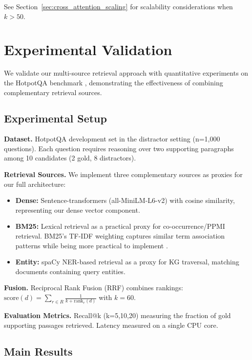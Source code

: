 \documentclass[11pt,a4paper]{article}
\begin{document}
See Section~\ref{sec:cross_attention_scaling} for scalability considerations when $k > 50$.

\section{Experimental Validation}
\label{sec:experiments}

We validate our multi-source retrieval approach with quantitative experiments on the HotpotQA benchmark \citep{yang2018hotpotqa}, demonstrating the effectiveness of combining complementary retrieval sources.

\subsection{Experimental Setup}

\textbf{Dataset.} HotpotQA development set in the distractor setting (n=1,000 questions). Each question requires reasoning over two supporting paragraphs among 10 candidates (2 gold, 8 distractors).

\textbf{Retrieval Sources.} We implement three complementary sources as proxies for our full architecture:
\begin{itemize}
    \item \textbf{Dense:} Sentence-transformers (all-MiniLM-L6-v2) with cosine similarity, representing our dense vector component.
    \item \textbf{BM25:} Lexical retrieval as a practical proxy for co-occurrence/PPMI retrieval. BM25's TF-IDF weighting captures similar term association patterns while being more practical to implement \citep{manning2008introduction}.
    \item \textbf{Entity:} spaCy NER-based retrieval as a proxy for KG traversal, matching documents containing query entities.
\end{itemize}

\textbf{Fusion.} Reciprocal Rank Fusion (RRF) \citep{cormack2009rrf} combines rankings: $\text{score}(d) = \sum_{r \in R} \frac{1}{k + \text{rank}_r(d)}$ with $k=60$.

\textbf{Evaluation Metrics.} Recall@k (k=5,10,20) measuring the fraction of gold supporting passages retrieved. Latency measured on a single CPU core.

\subsection{Main Results}
\end{document}
